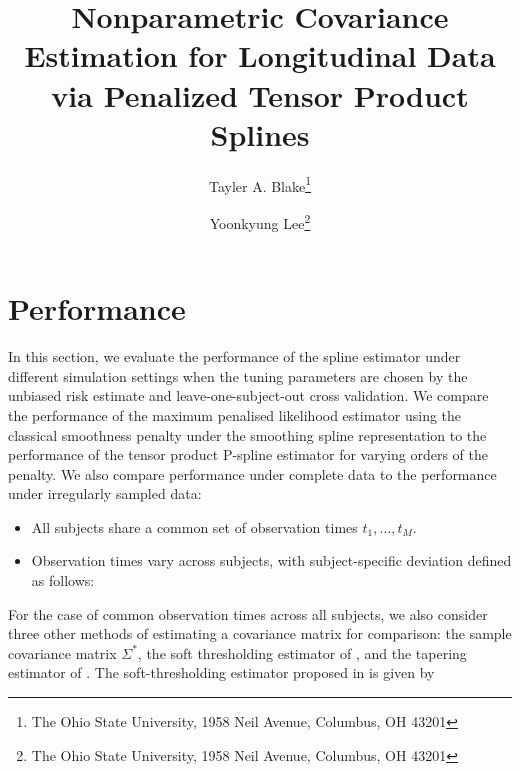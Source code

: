 \documentclass[12pt]{article}
\theoremstyle{definition}
\def\bL{\mathbf{L}}
\begin{document}
\def\bL{\mathbf{L}}



\title{ Nonparametric Covariance Estimation for Longitudinal Data via Penalized Tensor Product Splines}

\author{Tayler A. Blake\thanks{The Ohio State University, 1958 Neil Avenue, Columbus, OH 43201} \and  Yoonkyung Lee\thanks{The Ohio State University, 1958 Neil Avenue, Columbus, OH 43201}}


\maketitle

\section{Performance}
In this section, we evaluate the performance of the spline estimator under different simulation settings when the tuning parameters are chosen by the unbiased risk estimate and leave-one-subject-out cross validation. We compare the performance of the maximum penalised likelihood estimator using the classical smoothness penalty under the smoothing spline representation to the performance of the tensor product P-spline estimator for varying orders of the penalty. We also compare performance under complete data to the performance under irregularly sampled data:

\begin{itemize}
\item All subjects share a common set of observation times $t_1, \dots, t_M$.
\item Observation times vary across subjects, with subject-specific deviation defined as follows: 
\end{itemize}

For the case of common observation times across all subjects, we also consider three other methods of estimating a covariance matrix for comparison: the sample covariance matrix $\Sigma^*$, the soft thresholding estimator of \citet{rothman2009generalized}, and the tapering estimator of \citet{cai2010optimal}. The soft-thresholding estimator proposed in \citet{rothman2009generalized} is given by
\end{document}
